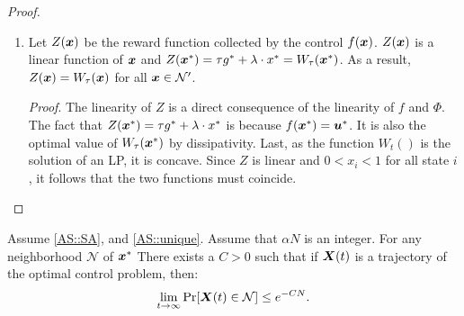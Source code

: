 \begin{proof}
\begin{enumerate}
        \emph{Proof}. We remark that $\bx(t+1) = \bx^* + (\bx(t)-\bx^*) P^*$, where $P^*$ is the matrix defined in Assumption~\ref{AS::stable}. Indeed, one has:
        \begin{align*}
            \Phi_j(\bx, f(\bx)) &= (\bx P^0)_j + (f(\bx) (P^1 - P^0))_j\\
            &= \sum_{i\in\sspace^+} x_i P^1_{ij} + \sum_{i\in\sspace^-} x_i P^0_{ij} + x_{i^*}P^0_{i^*,j} + (\alpha-\sum_{i\in\sspace^+} x_{i})(P^{1}_{i^*,j}-P^0_{i^*,j})\\
            &= \sum_{i\in\sspace^-\cup\{i^*\}} x_i P^0_{ij} + \sum_{i\in\sspace^+} x_i(P^1_{i,j} - P^{1}_{i^*,j}+P^0_{i^*,j}) + \alpha (P^1_{i^*,j}-P^0_{i^*,j})\\
            &= (\bx P^*)_j + \alpha ( P^1_{i^*,j}-P^0_{i^*,j} ),
        \end{align*}
        where $P^*$ is the matrix defined in Assumption~\ref{AS::stable}.

        Note that by construction, one has $\Phi(\bx^*,f(\bx^*))=\bx^*$. This implies that $\Phi_j(\bx, f(\bx)) - \Phi_j(\bx^*, f(\bx^*))= (\bx-\bx^*)P^*$. The result follows by Assumption~\ref{AS::stable} that imposes that the matrix $P^*$ is stable.
        
        \item Let $Z({\bm{x}})$ be the reward function collected by the control $f({\bm{x}})$. $Z({\bm{x}})$ is a linear function of ${\bm{x}}$ and $Z({\bm{x}}^*)=\tau g^*+\lambda \cdot x^*=W_{\tau}{({\bm{x}}^*)}$. As a result, $Z({\bm{x}})=W_{\tau}{({\bm{x}})}$ for all ${\bm{x}}\in\mathcal{N'}$. 

        \emph{Proof}. The linearity of $Z$ is a direct consequence of the linearity of $f$ and $\Phi$. The fact that $Z({\bm{x}}^*)=\tau g^*+\lambda \cdot x^*$ is because $f({\bm{x}}^*)=\bm{u}^*$. It is also the optimal value of $W_\tau({\bm{x}}^*)$ by dissipativity. Last, as the function $W_t()$ is the solution of an LP, it is concave. Since $Z$ is linear and $0<x_i<1$ for all state $i$, it follows that the two functions must coincide.
    \end{enumerate}
\end{proof}


\begin{lemma}
    \label{lem:concentration}
    Assume \ref{AS::SA}, and \ref{AS::unique}. Assume that $\alpha N$ is an integer. For any neighborhood $\mathcal{N}$ of ${\bm{x}}^*$ There exists a $C>0$ such that if ${\bm{X}(t)}$ is a trajectory of the optimal control problem, then: 
    \begin{align*}
        \lim_{t\to\infty} \Pr[{\bm{X}(t)}\in\mathcal{N}] \le e^{-C N }.
    \end{align*}
\end{lemma}


